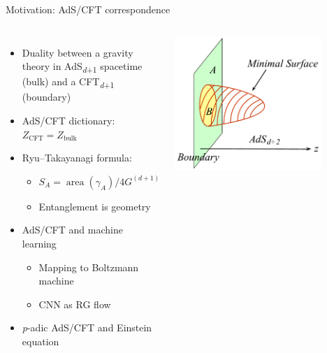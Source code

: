\documentclass{fdubeamer}
\newcommand{\1}{\mathbb{1}}
\begin{document}
\begin{frame}{Motivation: AdS/CFT correspondence}

\begin{columns}[c]


    \begin{itemize}
      \item Duality between a gravity theory in AdS\textsubscript{\textit{d}+1} spacetime (bulk) and a CFT\textsubscript{\textit{d}+1} (boundary)
      \item AdS/CFT dictionary: $Z_{\mathrm{CFT}}=Z_{\mathrm{bulk}}$
      \item Ryu--Takayanagi formula:

        \begin{itemize}
          \item $S_A = \operatorname{area}(\gamma_A) / 4G^{(d+1)}$
          \item Entanglement is geometry
        \end{itemize}

      \item AdS/CFT and machine learning

        \begin{itemize}
          \item Mapping to Boltzmann machine
          \item CNN as RG flow
        \end{itemize}

      \item \textit{p}-adic AdS/CFT and Einstein equation
    \end{itemize}


    \centering
    \includegraphics[width=0.8\textwidth]{images/rt-formula.pdf}

\end{columns}


\end{frame}
\end{document}
